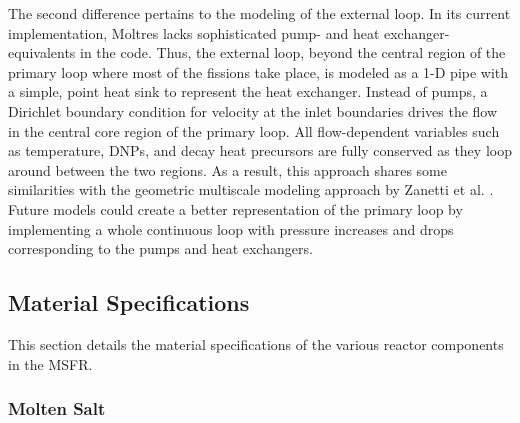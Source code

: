 The second difference pertains to the modeling of the external loop. In its
current implementation, Moltres lacks sophisticated pump- and heat exchanger-
equivalents in the code. Thus, the external loop, beyond the central region of
the primary loop where most of the fissions take place, is modeled as a 1-D
pipe with a simple, point heat sink to represent the heat exchanger. Instead
of pumps, a Dirichlet boundary condition for velocity at the inlet boundaries
drives the flow in the central core region of the primary loop. All
flow-dependent variables such as temperature, \glspl{DNP},
and decay heat precursors are fully conserved as they loop around between the
two regions. As a result, this approach shares some similarities with the
geometric multiscale modeling approach by Zanetti et al.
\cite{zanetti_geometric_2015}. Future models could create a better
representation of the primary loop by implementing a whole continuous loop
with pressure increases and drops corresponding to the pumps and heat
exchangers.

\subsection{Material Specifications}

This section details the material specifications of the various reactor
components in the \gls{MSFR}.

\subsubsection{Molten Salt}

